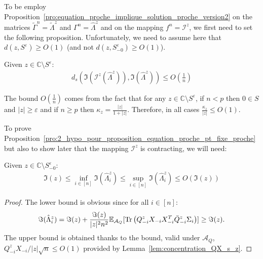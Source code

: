 \documentclass[a4papaer, titlepage]{book}
\begin{document}
To be employ Proposition~\ref{pro:equation_proche_implique_solution_proche_version2} on the matrices $\tilde \Gamma^n = \tilde \Lambda^z$ and $\Gamma^n = \hat \Lambda^z$ and on the mapping $f^n = \mathcal I^z$, we first need to set the following proposition. Unfortunately, we need to assume here that $d(z,S^\varepsilon)\geq O(1)$ (and not $ d(z,S_{-0}^\varepsilon)\geq O(1)$).
\begin{proposition}\label{pro:2_hypo_pour_proposition_equation_proche_pt_fixe_proche}
  Given $z \in \mathbb C \setminus S^\varepsilon$: 
  \begin{align*}
    d_s \left(\Im(\mathcal I^z(\hat \Lambda^z)), \Im(\hat \Lambda^z)\right)  \leq O \left(\frac{1}{n}\right)
  \end{align*}
\end{proposition}
\begin{remark}\label{rem:borne_kappa_z_z_sur_S}
The bound $O(\frac{1}{n})$ comes from the fact that for any $z \in \mathbb C \setminus S^ \varepsilon$, if $n<p$ then $0 \in S$ and $|z| \geq \varepsilon$ and if $n\geq p$ then $\kappa_z = \frac{|z|}{1+ |z|}$. Therefore, in all cases $\frac{\kappa_z}{|z|} \leq O(1)$.
\end{remark}
To prove Proposition~\ref{pro:2_hypo_pour_proposition_equation_proche_pt_fixe_proche} but also to show later that the mapping $\mathcal I^z$ is contracting, we will need:

\begin{lemma}\label{lem:hat_Lambda_n_borne_par_Im_z}
        Given $z \in \mathbb C \setminus S_{-0}^\varepsilon$:
        \begin{align*}
         \Im(z)
      \leq \inf_{i\in[n]} \Im \left(\hat \Lambda^z_i\right)
      \leq \sup_{i\in[n]} \Im \left(\hat \Lambda^z_i\right) \leq O \left(\Im(z)\right)  
        \end{align*}
      \end{lemma}
    \begin{proof}
  The lower bound is obvious since for all $i\in[n]$:
  \begin{align*}
    \Im(\hat \Lambda^z_i) = \Im(z) +\frac{\Im(z)}{|z|^2n^2}\mathbb E_{\mathcal A_Q}[\operatorname{Tr} \left( Q^z_{-i}  X_{-i}X_{-i}^T\bar Q^z_{-i} \Sigma_i \right)] \geq \Im(z).
  \end{align*}
  The upper bound is obtained thanks to the bound, valid under $\mathcal A_Q$, $Q^z_{-i}  X_{-i}/|z|\sqrt n \leq O(1)$ provided by Lemma~\ref{lem:concentration_QX_s_z}.
     
  \end{proof}
\end{document}
